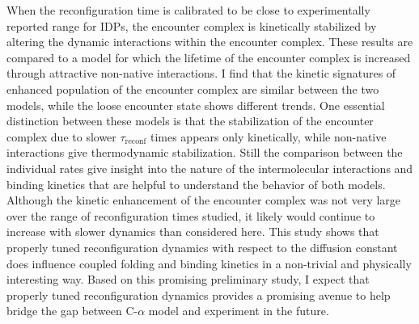 \documentclass[../talant.diss.submit.tex]{subfiles}
\begin{document}
When the reconfiguration time
is calibrated to be close to
experimentally reported range for IDPs, \cite{chen:10g,schuler:02p}
the encounter complex is kinetically stabilized by altering the dynamic 
interactions within the encounter complex.  %
These results are compared to a model for which the lifetime of the encounter complex is increased
through attractive non-native interactions\cite{huang:10a}.
I find that the kinetic signatures of enhanced population of the encounter complex
are similar between the two models, while the loose encounter state shows different trends.
One essential distinction between these models is that the stabilization of the encounter complex
due to slower $\tau_\mathrm{reconf}$ times appears only kinetically, while non-native interactions
give thermodynamic stabilization. Still the comparison between the individual rates give insight
into the nature of the intermolecular interactions and binding kinetics that are helpful to understand
the behavior of both models. 
Although the kinetic enhancement of the encounter complex was not very large
over the range of reconfiguration times studied, 
it likely would continue to increase with slower dynamics than considered here.
This study shows that properly tuned reconfiguration dynamics with respect to
the diffusion constant does influence coupled folding and binding kinetics in a non-trivial
and physically interesting way. Based on this promising preliminary study,
I expect that properly tuned reconfiguration dynamics provides a promising avenue to
help bridge the gap between C-$\alpha$ model and experiment in the future.
\end{document}
